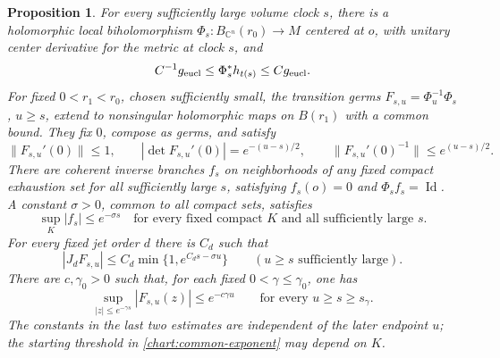 \documentclass[11pt]{article}
\newtheorem{proposition}[theorem]{Proposition}
\theoremstyle{definition}
\theoremstyle{remark}
\newcommand{\C}{\mathbb C}
\DeclareMathOperator{\Id}{Id}
\numberwithin{equation}{section}
\begin{document}
\begin{proposition}\label{prop:shrinking-charts}
For every sufficiently large volume clock $s$, there is a
holomorphic local biholomorphism
$\Phi_s:B_{\C^n}(r_0)\to M$ centered at $o$, with unitary
center derivative for the metric at clock $s$, and
\begin{equation}\label{chart:uniform-chart-metric}
 C^{-1}g_{\rm eucl}\le\Phi_s^*h_{t(s)}\le Cg_{\rm eucl}.
\end{equation}
For fixed $0<r_1<r_0$, chosen sufficiently small, the transition
germs $F_{s,u}=\Phi_u^{-1}\Phi_s$, $u\ge s$, extend to
nonsingular holomorphic maps on $B(r_1)$ with a common bound.
They fix $0$, compose as germs, and satisfy
\begin{equation}\label{chart:center-transitions}
 \|F_{s,u}'(0)\|\le1,\qquad
 |\det F_{s,u}'(0)|=e^{-(u-s)/2},\qquad
 \|F_{s,u}'(0)^{-1}\|\le e^{(u-s)/2}.
\end{equation}
There are coherent inverse branches $f_s$ on neighborhoods of
any fixed compact exhaustion set for all sufficiently large
$s$, satisfying $f_s(o)=0$ and $\Phi_sf_s=\Id$.  A constant
$\sigma>0$, common to all compact sets, satisfies
\begin{equation}\label{chart:common-exponent}
 \sup_K|f_s|\le e^{-\sigma s}
 \quad\text{for every fixed compact }K
 \text{ and all sufficiently large }s.
\end{equation}
For every fixed jet order $d$ there is $C_d$ such that
\begin{equation}\label{chart:transition-jets}
 |J_dF_{s,u}|\le C_d\min\{1,e^{C_ds-\sigma u}\}
 \qquad(u\ge s\text{ sufficiently large}).
\end{equation}
There are $c,\gamma_0>0$ such that, for each fixed
$0<\gamma\le\gamma_0$, one has
\begin{equation}\label{chart:transition-small-balls}
 \sup_{|z|\le e^{-\gamma s}}|F_{s,u}(z)|
 \le e^{-c\gamma u}
 \qquad\text{for every }u\ge s\ge s_\gamma.
\end{equation}
The constants in the last two estimates are independent of the
later endpoint $u$; the starting threshold in
\eqref{chart:common-exponent} may depend on $K$.
\end{proposition}
\end{document}
